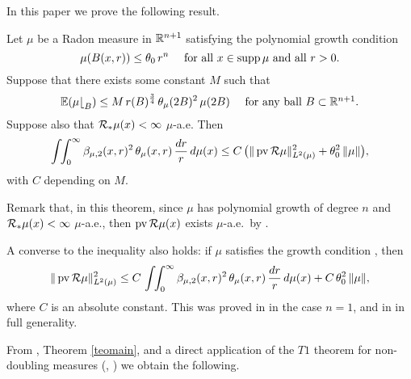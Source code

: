 In this paper we prove the following result.

\begin{theorem}\label{teomain}
	Let $\mu$ be a Radon measure in ${\mathbb R}^{n+1}$ satisfying the polynomial growth condition
	\begin{equation}\label{eqgrow00}
		\mu(B(x,r))\leq \theta_0\,r^n\quad \mbox{ for all $x\in\operatorname{supp}\mu$ and all $r>0$}.
	\end{equation}
	Suppose that there exists some
	constant $M$ such that
	\begin{equation}\label{eqwolff99}
		\mathbb E(\mu{\lfloor}_B) \leq M\,r(B)^{\frac3{4}}\,\theta_\mu(2B)^2\,\mu(2B)\quad \mbox{ for any ball $B\subset{\mathbb R}^{n+1}$}.
	\end{equation}
	Suppose also that ${\mathcal R}_*\mu(x)<\infty$ $\mu$-a.e. Then
	\begin{equation}\label{eqteo*}
		\int \!\!\int_0^\infty \beta_{\mu,2}(x,r)^2\,\theta_\mu(x,r)\,
		\frac{dr}r\,d\mu(x) \leq C\,\big(\|\operatorname{pv}{\mathcal R}\mu\|_{L^2(\mu)}^2 + \theta_0^2\,\|\mu\|\big),
	\end{equation}
	with $C$ depending on $M$.
\end{theorem}

Remark that, in this theorem, since $\mu$ has polynomial growth of degree $n$ and
${\mathcal R}_*\mu(x)<\infty$ $\mu$-a.e., then $\operatorname{pv}{\mathcal R}\mu(x)$ exists
$\mu$-a.e.\ by \cite{NToV2}. 

A converse to the inequality  also holds: if $\mu$ satisfies the growth condition
, then
\begin{equation}\label{eqbetawolff'}
	\|\operatorname{pv}{\mathcal R}\mu\|_{L^2(\mu)}^2\leq C\,\int\!\!\int_0^\infty \beta_{\mu,2}(x,r)^2\,\theta_\mu(x,r)\,\frac{dr}r\,d\mu(x) 
	+C\,\theta_0^2\,\|\mu\|,
\end{equation}
where $C$ is an absolute constant. This was proved in \cite{Azzam-Tolsa} in the case $n=1$, and in \cite{Girela} in full generality. 

From , Theorem \ref{teomain}, and a direct application of the $T1$ theorem for non-doubling measures (\cite{NTrV1}, \cite{NTrV2}) we obtain the following.

